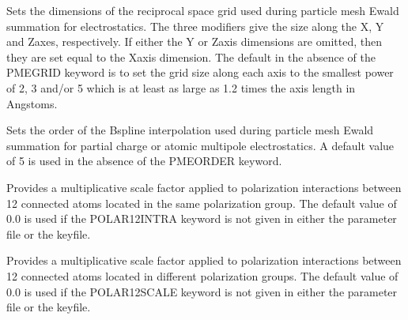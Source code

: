 \documentclass[letterpaper,11pt,english]{sphinxmanual}
\begin{document}
\ignorespaces {}\label{\detokenize{text/keywords:key-pme-grid}}\begin{description}
\sphinxAtStartPar
Sets the dimensions of the reciprocal space grid used during particle mesh Ewald summation for electrostatics. The three modifiers give the size along the X\sphinxhyphen{}, Y\sphinxhyphen{} and Z\sphinxhyphen{}axes, respectively. If either the Y\sphinxhyphen{} or Z\sphinxhyphen{}axis dimensions are omitted, then they are set equal to the X\sphinxhyphen{}axis dimension. The default in the absence of the PME\sphinxhyphen{}GRID keyword is to set the grid size along each axis to the smallest power of 2, 3 and/or 5 which is at least as large as 1.2 times the axis length in Angstoms.

\end{description}

\ignorespaces {}\label{\detokenize{text/keywords:key-pme-order}}\begin{description}
\sphinxAtStartPar
Sets the order of the B\sphinxhyphen{}spline interpolation used during particle mesh Ewald summation for partial charge or atomic multipole electrostatics. A default value of 5 is used in the absence of the PME\sphinxhyphen{}ORDER keyword.

\end{description}

\ignorespaces {}\label{\detokenize{text/keywords:key-polar-12-intra}}\begin{description}
\sphinxAtStartPar
Provides a multiplicative scale factor applied to polarization interactions between 1\sphinxhyphen{}2 connected atoms located in the same polarization group. The default value of 0.0 is used if the POLAR\sphinxhyphen{}12\sphinxhyphen{}INTRA keyword is not given in either the parameter file or the keyfile.

\end{description}

\ignorespaces {}\label{\detokenize{text/keywords:key-polar-12-scale}}\begin{description}
\sphinxAtStartPar
Provides a multiplicative scale factor applied to polarization interactions between 1\sphinxhyphen{}2 connected atoms located in different polarization groups. The default value of 0.0 is used if the POLAR\sphinxhyphen{}12\sphinxhyphen{}SCALE keyword is not given in either the parameter file or the keyfile.

\end{description}
\end{document}
